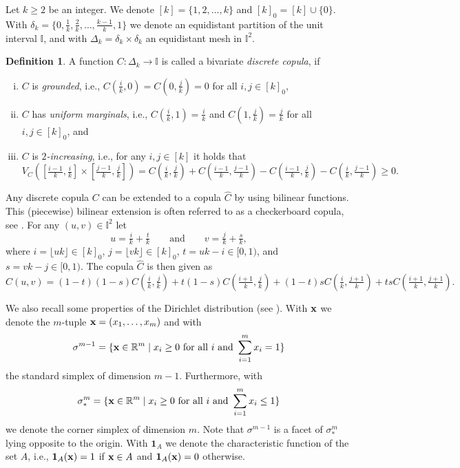\documentclass[12pt,a4paper]{amsart}
\theoremstyle{definition}
\newtheorem{definition}[theorem]{Definition}
\newcommand{\II}{\mathbb{I}}
\newcommand{\RR}{\mathbb{R}}
\newcommand{\dk}{\delta_k}
\newcommand{\DK}{\Delta_k}
\newcommand{\XX}{{\bf x}}
\newcommand{\be}{\boldsymbol{1}}
\begin{document}
Let $k \ge 2$ be an integer. We denote $[k]=\{1,2, \ldots, k\}$ and $[k]_0=[k] \cup\{0\}$. With $\dk= \{ 0,\tfrac1k, \tfrac2k, \ldots, \tfrac{k-1}{k}, 1 \}$ we denote an equidistant partition of the unit interval $\II$, and with $\DK= \dk \times \dk$ an equidistant mesh in $\II^2$.

\begin{definition}
A function  $C\colon\DK\to\II$ is called a bivariate \emph{discrete copula}, if
\begin{enumerate}[(i)]
    \item $C$ is \emph{grounded}, i.e., $C(\tfrac{i}{k}, 0)=C(0, \tfrac{j}{k})=0$ for all $i,j \in [k]_0$,
    \item $C$ has \emph{uniform marginals}, i.e., $C(\tfrac{i}{k}, 1)=\tfrac{i}{k}$ and $C(1, \tfrac{j}{k})=\tfrac{j}{k}$ for all $i, j \in [k]_0$, and
    \item $C$ is \emph{$2$-increasing}, i.e., for any $i,j \in [k]$ it holds that
\begin{equation*}
    V_C([\tfrac{i-1}{k},\tfrac{i}{k}]\times[\tfrac{j-1}{k},\tfrac{j}{k}]) = C(\tfrac{i}{k},\tfrac{j}{k}) + C(\tfrac{i-1}{k},\tfrac{j-1}{k}) - C(\tfrac{i-1}{k},\tfrac{j}{k}) - C(\tfrac{i}{k},\tfrac{j-1}{k}) \ge 0.
\end{equation*}
\end{enumerate}
\end{definition}

Any discrete copula $C$ can be extended to a copula $\widehat{C}$ by using bilinear functions. This (piecewise) bilinear extension is often referred to as a checkerboard copula, see \cite{MikTay10,LinWanZhaZha25}. For any $(u,v) \in \II^2$ let 
$$u = \tfrac{i}{k} + \tfrac{t}{k} \qquad \text{and} \qquad v = \tfrac{j}{k} + \tfrac{s}{k},$$
where $i=\lfloor uk \rfloor \in [k]_0$, $j=\lfloor vk \rfloor \in [k]_0$, $t = uk -i \in [0,1)$, and $s = vk -j \in [0,1)$. The copula $\widehat{C}$ is then given as
$$\widehat{C}(u,v) = (1-t)(1-s)C(\tfrac{i}{k},\tfrac{j}{k}) + t(1-s)C(\tfrac{i+1}{k},\tfrac{j}{k}) + (1-t)sC(\tfrac{i}{k},\tfrac{j+1}{k}) +tsC(\tfrac{i+1}{k},\tfrac{j+1}{k}).$$





We also recall some properties of the Dirichlet distribution (see \cite{JonKot72,KotBalJoh00}).
With ${\bf x}$ we denote the $m$-tuple ${\bf x}=(x_1,\ldots,x_m)$ and with $$\sigma^{m-1}= \{ \XX \in \RR^m \mid x_i \ge 0 \text{ for all $i$ and } \sum_{i=1}^m x_i =1 \}$$ the standard simplex of dimension $m-1$.
Furthermore, with $$\sigma_*^m= \{ \XX \in \RR^m \mid x_i \ge 0 \text{ for all $i$ and } \sum_{i=1}^m x_i \le 1 \}$$ we denote the corner simplex of dimension $m$. Note that $\sigma^{m-1}$ is a facet of $\sigma_*^m$ lying opposite to the origin.
With $\be_A$ we denote the characteristic function of the set $A$, i.e., $\be_A(\XX)=1$ if $\XX \in A$ and $\be_A(\XX)=0$ otherwise.
\end{document}
